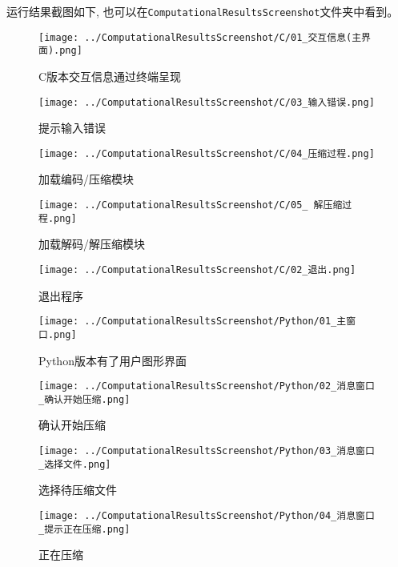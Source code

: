 \documentclass[a4paper]{ctexart}
\begin{document}
运行结果截图如下, 也可以在\texttt{ComputationalResultsScreenshot}文件夹中看到。

\begin{figure}[H]
\centering
\texttt{[image: ../ComputationalResultsScreenshot/C/01\_交互信息(主界面).png]}
\caption{C版本交互信息通过终端呈现}
\end{figure}

\begin{figure}[H]
\centering
\texttt{[image: ../ComputationalResultsScreenshot/C/03\_输入错误.png]}
\caption{提示输入错误}
\end{figure}

\begin{figure}[H]
\centering
\texttt{[image: ../ComputationalResultsScreenshot/C/04\_压缩过程.png]}
\caption{加载编码/压缩模块}
\end{figure}

\begin{figure}[H]
\centering
\texttt{[image: ../ComputationalResultsScreenshot/C/05\_ 解压缩过程.png]}
\caption{加载解码/解压缩模块}
\end{figure}

\begin{figure}[H]
\centering
\texttt{[image: ../ComputationalResultsScreenshot/C/02\_退出.png]}
\caption{退出程序}
\end{figure}

\begin{figure}[H]
\centering
\texttt{[image: ../ComputationalResultsScreenshot/Python/01\_主窗口.png]}
\caption{Python版本有了用户图形界面}
\end{figure}

\begin{figure}[H]
\centering
\texttt{[image: ../ComputationalResultsScreenshot/Python/02\_消息窗口\_确认开始压缩.png]}
\caption{确认开始压缩}
\end{figure}

\begin{figure}[H]
\centering
\texttt{[image: ../ComputationalResultsScreenshot/Python/03\_消息窗口\_选择文件.png]}
\caption{选择待压缩文件}
\end{figure}

\begin{figure}[H]
\centering
\texttt{[image: ../ComputationalResultsScreenshot/Python/04\_消息窗口\_提示正在压缩.png]}
\caption{正在压缩}
\end{figure}
\end{document}
